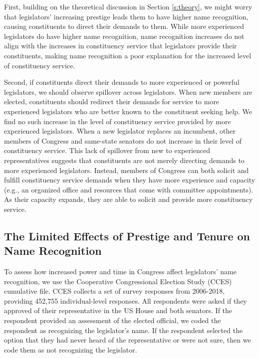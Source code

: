 \documentclass[12pt]{article}
\begin{document}
First, building on the theoretical discussion in Section \ref{s:theory}, we might worry that legislators' increasing prestige leads them to have higher name recognition, causing constituents to direct their demands to them. %
While more experienced legislators do have higher name recognition, name recognition increases do not align with the increases in constituency service that legislators provide their constituents, making name recognition a poor explanation for the increased level of constituency service.  

Second, if constituents direct their demands to more experienced or powerful legislators, we should observe spillover across legislators. When new members are elected, constituents should redirect their demands for service to more experienced legislators who are better known to the constituent seeking help. We find no such increase in the level of constituency service provided by more experienced legislators. When a new legislator replaces an incumbent, other members of Congress and same-state senators do not increase in their level of constituency service. This lack of spillover from new to experienced representatives suggests that constituents are not merely directing demands to more experienced legislators. Instead, members of Congress can both solicit and fulfill constituency service demands when they have more experience and capacity (e.g., an organized office and resources that come with committee appointments). As their capacity expands, they are able to solicit and provide more constituency service.  %

\subsection{The Limited Effects of Prestige and Tenure on Name Recognition}
To assess how increased power and time in Congress affect legislators' name recognition, we use the Cooperative Congressional Election Study (CCES) cumulative file. CCES collects a set of survey responses from 2006-2018, providing 452,755 individual-level responses. All respondents were asked if they approved of their representative in the US House and both senators. If the respondent provided an assessment of the elected official, we coded the respondent as recognizing the legislator's name. If the respondent selected the option that they had never heard of the representative or were not sure, then we code them as not recognizing the legislator.
\end{document}
